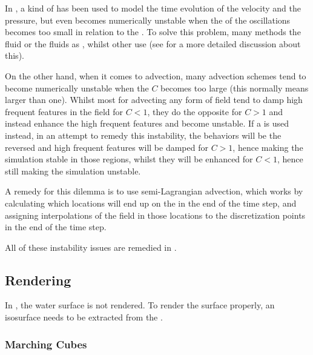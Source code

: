 In \thisprojectwork, a kind of  has been used to model the time evolution of the velocity and the pressure, but even  becomes numerically unstable when the \period of the oscillations becomes too small in relation to the \timestep. To solve this problem, many methods \approximate the fluid or the fluids as \incompressible, whilst other use  (see 
 for a more detailed discussion about this).

On the other hand, when it comes to advection, many advection schemes tend to become numerically unstable when the  $C$ becomes too large (this normally means larger than one). Whilst most  for advecting any form of field tend to damp high frequent features in the field for $C < 1$, they do the opposite for $C > 1$ and instead enhance the high frequent features and become unstable. If a  is used instead, in an attempt to remedy this instability, the behaviors will be the reversed and high frequent features will be damped for $C > 1$, hence making the simulation stable in those regions, whilst they will be enhanced for $C < 1$, hence still making the simulation unstable.

A remedy for this dilemma is to use semi-Lagrangian advection, which works by calculating which locations will end up on the  in the end of the time step, and assigning interpolations of the field in those locations to the discretization points in the end of the time step.

All of these instability issues are remedied in \citep{Stam1999}.

\subsection{Rendering}

In \thisprojectwork, the water surface is not rendered. To render the surface properly, an isosurface needs to be extracted from the .

\subsubsection{Marching Cubes}

